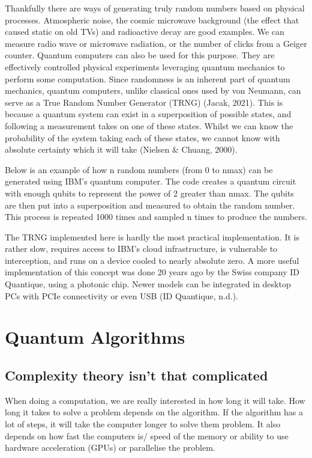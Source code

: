 \documentclass{book}
\begin{document}
Thankfully there are ways of generating truly random numbers based on physical processes. Atmospheric noise, the cosmic microwave background (the effect that caused static on old TVs) and radioactive decay are good examples. We can measure radio wave or microwave radiation, or the number of clicks from a Geiger counter.
Quantum computers can also be used for this purpose. They are effectively controlled physical experiments leveraging quantum mechanics to perform some computation. Since randomness is an inherent part of quantum mechanics, quantum computers, unlike classical ones used by von Neumann, can serve as a True Random Number Generator (TRNG) (Jacak, 2021). This is because a quantum system can exist in a superposition of possible states, and following a measurement takes on one of these states. Whilst we can know the probability of the system taking each of these states, we cannot know with absolute certainty which it will take (Nielsen \& Chuang, 2000).

Below is an example of how n random numbers (from 0 to nmax) can be generated using IBM’s quantum computer. The code creates a quantum circuit with enough qubits to represent the power of 2 greater than nmax. The qubits are then put into a superposition and measured to obtain the random number. This process is repeated 1000 times and sampled n times to produce the numbers.  

The TRNG implemented here is hardly the most practical implementation. It is rather slow, requires access to IBM’s cloud infrastructure, is vulnerable to interception, and runs on a device cooled to nearly absolute zero. A more useful implementation of this concept was done 20 years ago by the Swiss company ID Quantique, using a photonic chip. Newer models can be integrated in desktop PCs with PCIe connectivity or even USB (ID Quantique, n.d.).

\chapter{Quantum Algorithms}


\section{ Complexity theory isn't that complicated}

When doing a computation, we are really interested in how long it will take. How long it takes to solve a problem depends on the algorithm. If the algorithm has a lot of steps, it will take the computer longer to solve them problem. It also depends on how fast the computers is/ speed of the memory or ability to use hardware acceleration (GPUs) or parallelise the problem. 
\end{document}
